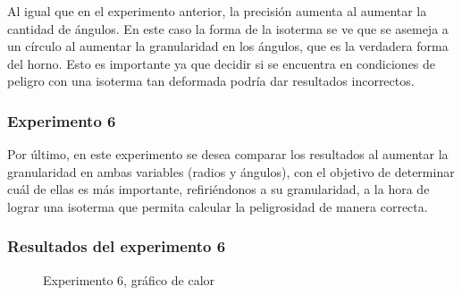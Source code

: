 \par Al igual que en el experimento anterior, la precisión aumenta al aumentar la cantidad de ángulos. En este caso la forma de la isoterma se ve que se asemeja a un círculo al aumentar la granularidad en los ángulos, que es la verdadera forma del horno. Esto es importante ya que decidir si se encuentra en condiciones de peligro con una isoterma tan deformada podría dar resultados incorrectos.

\subsubsection{Experimento 6}

\par Por último, en este experimento se desea comparar los resultados al aumentar la granularidad en ambas variables (radios y ángulos), con el objetivo de determinar cuál de ellas es más importante, refiriéndonos a su granularidad, a la hora de lograr una isoterma que permita calcular la peligrosidad de manera correcta.


\subsubsection{Resultados del experimento 6}

\begin{figure}[ht]
\begin{center}
\caption{Experimento 6, gráfico de calor}
\end{center}
\end{figure}

